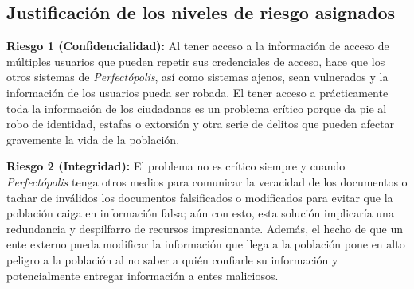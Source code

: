\subsection*{Justificación de los niveles de riesgo asignados}

\begin{enumerateColor}
    \item \textbf{Riesgo 1 (Confidencialidad):} 
	Al tener acceso a la información de acceso de múltiples usuarios que pueden repetir sus credenciales de acceso, hace que los otros sistemas de \textit{Perfectópolis}, así como sistemas ajenos, sean vulnerados y la información de los usuarios pueda ser robada. El tener acceso a prácticamente toda la información de los ciudadanos es un problema crítico porque da pie al robo de identidad, estafas o extorsión y otra serie de delitos que pueden afectar gravemente la vida de la población.

    \item \textbf{Riesgo 2 (Integridad):} 
	El problema no es crítico siempre y cuando \textit{Perfectópolis} tenga otros medios para comunicar la veracidad de los documentos o tachar de inválidos los documentos falsificados o modificados para evitar que la población caiga en información falsa; aún con esto, esta solución implicaría una redundancia y despilfarro de recursos impresionante. Además, el hecho de que un ente externo pueda modificar la información que llega a la población pone en alto peligro a la población al no saber a quién confiarle su información y potencialmente entregar información a entes maliciosos.



\end{enumerateColor}
